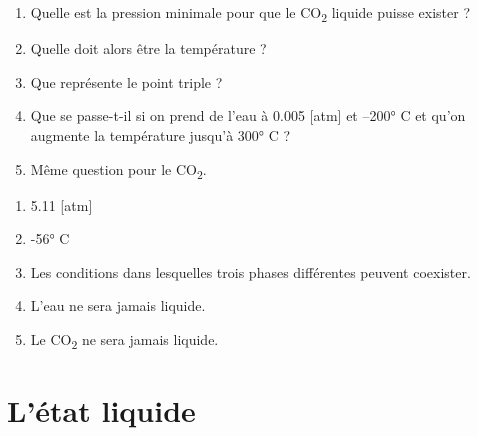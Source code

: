 \documentclass[
  11pt,
  a4paper,
  openany]{book}
\providecommand{\tightlist}{%
  \setlength{\itemsep}{0pt}\setlength{\parskip}{0pt}}
\begin{document}
\begin{Exercise}

\begin{enumerate}
\def\labelenumi{\arabic{enumi}.}
\tightlist
\item
  Quelle est la pression minimale pour que le CO\textsubscript{2} liquide puisse exister ?\\
\item
  Quelle doit alors être la température ?\\
\item
  Que représente le point triple ?\\
\item
  Que se passe-t-il si on prend de l'eau à 0.005 {[}atm{]} et --200° C et qu'on augmente la température jusqu'à 300° C ?\\
\item
  Même question pour le CO\textsubscript{2}.\\
\end{enumerate}

\end{Exercise}

\begin{Answer}

\begin{enumerate}
\def\labelenumi{\arabic{enumi}.}
\tightlist
\item
  5.11 {[}atm{]}
\item
  -56° C
\item
  Les conditions dans lesquelles trois phases différentes peuvent coexister.
\item
  L'eau ne sera jamais liquide.
\item
  Le CO\textsubscript{2} ne sera jamais liquide.
\end{enumerate}

\end{Answer}

\newpage

\hypertarget{luxe9tat-liquide}{%
\section{L'état liquide}\label{luxe9tat-liquide}}
\end{document}
